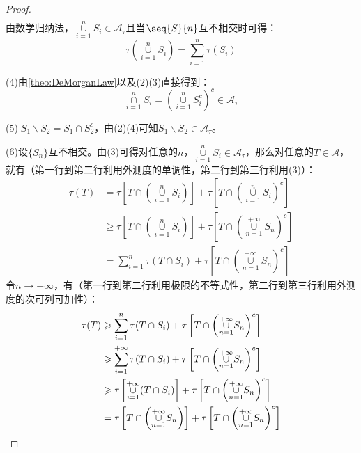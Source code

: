 \begin{proof}
\begin{align*}
	\end{align*}
	由数学归纳法，$\underset{i=1}{\overset{n}{\cup}}S_i\in \mathscr{A}_{\tau}$且当$\seq{S}{n}$互不相交时可得：
	\begin{equation*}
		\tau\left(\underset{i=1}{\overset{n}{\cup}}S_i\right)=\sum_{i=1}^{n}\tau(S_i)
	\end{equation*}\par
	(4)由\cref{theo:DeMorganLaw}以及(2)(3)直接得到：
	\begin{equation*}
		\underset{i=1}{\overset{n}{\cap}}S_i=\left(\underset{i=1}{\overset{n}{\cup}}S_i^c\right)^c\in \mathscr{A}_{\tau}
	\end{equation*}\par
	(5)$\;S_1\backslash S_2=S_1\cap S_2^c$，由(2)(4)可知$S_1\backslash S_2\in \mathscr{A}_{\tau}$。\par
	(6)设$\{S_n\}$互不相交。由(3)可得对任意的$n$，$\underset{i=1}{\overset{n}{\cup}}S_i\in \mathscr{A}_{\tau}$，那么对任意的$T\in \mathscr{A}$，就有（第一行到第二行利用外测度的单调性，第二行到第三行利用(3)）：
	\begin{align*}
		\tau(T)&=\tau\left[T\cap\left(\underset{i=1}{\overset{n}{\cup}}S_i\right)\right]+\tau\left[T\cap\left(\underset{i=1}{\overset{n}{\cup}}S_i\right)^c\right] \\
		&\geqslant \tau\left[T\cap\left(\underset{i=1}{\overset{n}{\cup}}S_i\right)\right]+\tau\left[T\cap\left(\underset{n=1}{\overset{+\infty}{\cup}}S_n\right)^c\right] \\
		&=\sum_{i=1}^n\tau(T\cap S_i)+\tau\left[T\cap\left(\underset{n=1}{\overset{+\infty}{\cup}}S_n\right)^c\right]
	\end{align*}
	令$n\to+\infty$，有（第一行到第二行利用极限的不等式性，第二行到第三行利用外测度的次可列可加性）：
	\begin{align}
		\tau(T)&\geqslant\sum_{i=1}^n\tau(T\cap S_i)+\tau\left[T\cap\left(\underset{n=1}{\overset{+\infty}{\cup}}S_n\right)^c\right]\notag \\
		&\geqslant\sum_{i=1}^{+\infty} \tau(T\cap S_i)+\tau\left[T\cap\left(\underset{n=1}{\overset{+\infty}{\cup}}S_n\right)^c\right] \label{eq:TcupSi}\\
		&\geqslant \tau\left[\underset{i=1}{\overset{+\infty}{\cup}}(T\cap S_i)\right]+\tau\left[T\cap\left(\underset{n=1}{\overset{+\infty}{\cup}}S_n\right)^c\right] \notag \\ &=\tau\left[T\cap\left(\underset{n=1}{\overset{+\infty}{\cup}}S_n\right)\right]+\tau\left[T\cap\left(\underset{n=1}{\overset{+\infty}{\cup}}S_n\right)^c\right]\notag

\end{align}
\end{proof}

